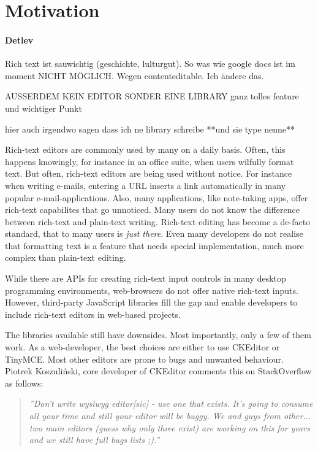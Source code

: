\section{Motivation}

\paragraph{Detlev} Rich text ist sauwichtig (geschichte, lulturgut). So was wie google docs ist im moment NICHT MÖGLICH. Wegen contenteditable. Ich ändere das.

AUSSERDEM KEIN EDITOR SONDER EINE LIBRARY ganz tolles feature und wichtiger Punkt

hier auch irgendwo sagen dass ich ne library schreibe **und sie type nenne**

Rich-text editors are commonly used by many on a daily basis. Often, this happens knowingly, for instance in an office suite, when users wilfully format text. But often, rich-text editors are being used without notice. For instance when writing e-mails, entering a URL inserts a link automatically in many popular e-mail-applications. Also, many applications, like note-taking apps, offer rich-text capabilites that go unnoticed. Many users do not know the difference between rich-text and plain-text writing. Rich-text editing has become a de-facto standard, that to many users is \textit{just there}. Even many developers do not realise that formatting text is a feature that needs special implementation, much more complex than plain-text editing.

While there are APIs for creating rich-text input controls in many desktop programming environments, web-browsers do not offer native rich-text inputs. However, third-party JavaScript libraries fill the gap and enable developers to include rich-text editors in web-based projects.

The libraries available still have downsides. Most importantly, only a few of them work. As a web-developer, the best choices are either to use CKEditor or TinyMCE. Most other editors are prone to bugs and unwanted behaviour. Piotrek Koszuli\'{n}ski, core developer of CKEditor comments this on StackOverflow as follows:

\begin{quotation}
\textit{''Don't write wysiwyg editor[sic] - use one that exists. It's going to consume all your time and still your editor will be buggy. We and guys from other... two main editors (guess why only three exist) are working on this for years and we still have full bugs lists ;).\cite{sopp}''}
\end{quotation} %

